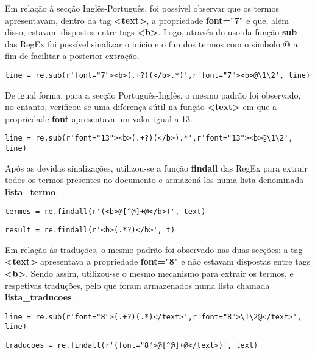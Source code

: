 Em relação à secção Inglês-Português, foi possível observar que os termos apresentavam, dentro da tag \textbf{<text>}, a propriedade \textbf{font="7"} e que, além disso, estavam dispostos entre tags \textbf{<b>}. Logo, através do uso da função \textbf{sub} das RegEx foi possível sinalizar o início e o fim dos termos com o símbolo \textbf{@} a fim de facilitar a posterior extração. 

\begin{lstlisting}[style=pythonstyle]
line = re.sub(r'font="7"><b>(.+?)(</b>.*)',r'font="7"><b>@\1\2', line)
\end{lstlisting}

De igual forma, para a secção Português-Inglês, o mesmo padrão foi observado, no entanto, verificou-se uma diferença sútil na função \textbf{<text>} em que a propriedade \textbf{font} apresentava um valor igual a 13.

\begin{lstlisting}[style=pythonstyle]
line = re.sub(r'font="13"><b>(.+?)(</b>).*',r'font="13"><b>@\1\2', line)
\end{lstlisting}

Após as devidas sinalizações, utilizou-se a função \textbf{findall} das RegEx para extrair todos os termos presentes no documento e armazená-los numa lista denominada \textbf{lista\_termo}.

\begin{lstlisting}[style=pythonstyle]
termos = re.findall(r'(<b>@[^@]+@</b>)', text)
\end{lstlisting}

\begin{lstlisting}[style=pythonstyle]
result = re.findall(r'<b>(.*?)</b>', t)
\end{lstlisting}

Em relação às traduções, o mesmo padrão foi observado nas duas secções: a tag \textbf{<text>} apresentava a propriedade \textbf{font="8"} e não estavam dispostas entre tags \textbf{<b>}. Sendo assim, utilizou-se o mesmo mecanismo para extrair os termos, e respetivas traduções, pelo que foram armazenados numa lista chamada \textbf{lista\_traducoes}.

\begin{lstlisting}[style=pythonstyle]
line = re.sub(r'font="8">(.+?)(.*)</text>',r'font="8">\1\2@</text>', line)
\end{lstlisting}

\begin{lstlisting}[style=pythonstyle]
traducoes = re.findall(r'(font="8">@[^@]+@</text>)', text)
\end{lstlisting}

